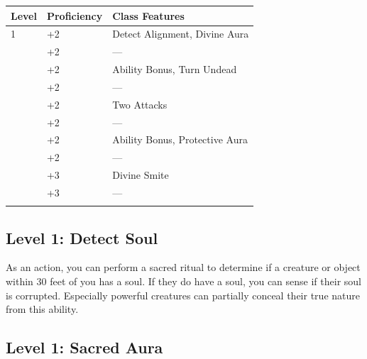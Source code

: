 \documentclass[12pt,letterpaper,twocolumn,openany,nodeprecatedcode,bg=none]{dndbook}
\let\oldsubsection\subsection
\renewcommand{\subsection}[1]{%
  \needspace{5\baselineskip}%
  \oldsubsection{#1}%
}
\begin{document}

{\def\LTcaptype{none} %
\begin{table}[!htbp]
\centering
\begin{tabular}{@{}
  >{\raggedright\arraybackslash}p{}
  >{\raggedright\arraybackslash}p{}
  >{\raggedright\arraybackslash}p{}@{}}
\toprule\noalign{}
\begin{minipage}[b]{\linewidth}\raggedright
Level
\end{minipage} & \begin{minipage}[b]{\linewidth}\raggedright
Proficiency
\end{minipage} & \begin{minipage}[b]{\linewidth}\raggedright
Class Features
\end{minipage} \\
\midrule\noalign{}
1 & +2 & Detect Alignment, Divine Aura \\
2 & +2 & --- \\
3 & +2 & Ability Bonus, Turn Undead \\
4 & +2 & --- \\
5 & +2 & Two Attacks \\
6 & +2 & --- \\
7 & +2 & Ability Bonus, Protective Aura \\
8 & +2 & --- \\
9 & +3 & Divine Smite \\
10 & +3 & --- \\
\bottomrule\noalign{}
\end{tabular}
\end{table}
}

\subsection{Level 1: Detect Soul}\label{level-1-detect-soul}

As an action, you can perform a sacred ritual to determine if a creature
or object within 30 feet of you has a soul. If they do have a soul, you
can sense if their soul is corrupted. Especially powerful creatures can
partially conceal their true nature from this ability.

\subsection{Level 1: Sacred Aura}\label{level-1-sacred-aura}
\end{document}
